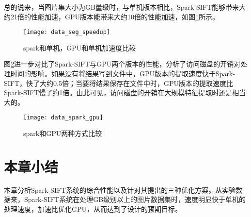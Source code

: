 总的说来，当图片集大小为GB量级时，与单机版本相比，Spark-SIFT能够带来大约21倍的性能加速，GPU版本能带来大约10倍的性能加速，如图\ref{fig:data_seg_speedup}所示。
\begin{figure}[htp]
\centering
\texttt{[image: data\_seg\_speedup]}
\caption{spark和单机，GPU和单机加速度比较}
\label{fig:data_seg_speedup}
\end{figure}

图\ref{fig:data_spark_gpu}进一步对比了Spark-SIFT与GPU两个版本的性能，分析了访问磁盘的开销对处理时间的影响。如果没有将结果写到文件中，GPU版本的提取速度快于Spark-SIFT，快了大约0.5倍；当要将结果保存在文件中时，GPU版本的提取速度比Spark-SIFT慢了约1倍。由此可见，访问磁盘的开销在大规模特征提取时还是相当大的。
\begin{figure}[htp]
\centering
\texttt{[image: data\_spark\_gpu]}
\caption{spark和GPU两种方式比较}
\label{fig:data_spark_gpu}
\end{figure}
\section{本章小结}
本章分析Spark-SIFT系统的综合性能以及针对其提出的三种优化方案。从实验数据来，Spark-SIFT系统在处理GB级别以上的图片数据集时，速度明显快于单机的处理速度，加速比优化GPU，从而达到了设计的预期目标。
